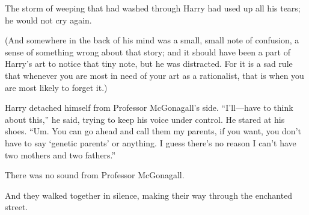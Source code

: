 The storm of weeping that had washed through Harry had used up all his tears;
he would not cry again.

(And somewhere in the back of his mind was a small, small note of confusion, a
sense of something wrong about that story; and it should have been a part of
Harry’s art to notice that tiny note, but he was distracted. For it is a sad
rule that whenever you are most in need of your art as a rationalist, that is
when you are most likely to forget it.)

Harry detached himself from Professor McGonagall’s side. “I’ll—have to think
about this,” he said, trying to keep his voice under control. He stared at his
shoes. “Um. You can go ahead and call them my parents, if you want, you don’t
have to say ‘genetic parents’ or anything. I guess there’s no reason I can’t
have two mothers and two fathers.”

There was no sound from Professor McGonagall.

And they walked together in silence, making their way through the enchanted street.

